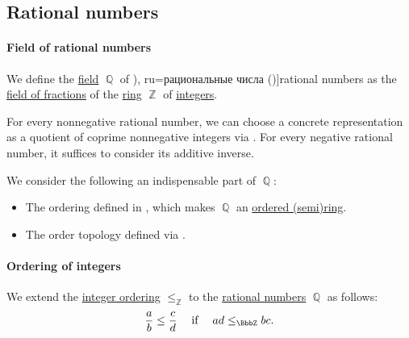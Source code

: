\subsection{Rational numbers}\label{subsec:rational_numbers}

\paragraph{Field of rational numbers}

\begin{definition}\label{def:rational_numbers}
  We define the \hyperref[def:field]{field} \( \BbbQ \) of \term[bg=рационални числа (\cite[sec. 1.1.2]{Соскова2015}), ru=рациональные числа (\cite[sec. 15.1]{Тыртышников2007})]{rational numbers} as the \hyperref[thm:field_of_fractions]{field of fractions} of the \hyperref[def:ring]{ring} \( \BbbZ \) of \hyperref[def:integers]{integers}.
\end{definition}
\begin{comments}
  \item For every nonnegative rational number, we can choose a concrete representation as a quotient of coprime nonnegative integers via . For every negative rational number, it suffices to consider its additive inverse.

  \item We consider the following an indispensable part of \( \BbbQ \):
  \begin{itemize}
    \item The ordering defined in , which makes \( \BbbQ \) an \hyperref[def:ordered_semiring]{ordered (semi)ring}.
    \item The order topology defined via .
  \end{itemize}
\end{comments}

\paragraph{Ordering of integers}

\begin{definition}\label{def:rational_number_ordering}
  We extend the \hyperref[def:integer_ordering]{integer ordering} \( \leq_\BbbZ \) to the \hyperref[def:rational_numbers]{rational numbers} \( \BbbQ \) as follows:
  \begin{equation*}
    \frac a b \leq \frac c d \quad\T{if}\quad ad \leq_\BbbZ bc.
  \end{equation*}
\end{definition}

